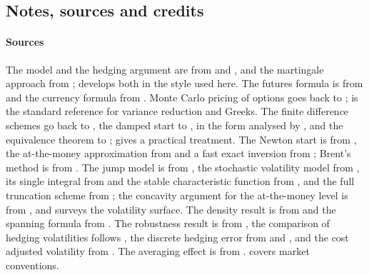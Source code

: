 \begin{chapterrefs}
\section{Notes, sources and credits}
\label{sec5:credits}

\paragraph{Sources}
The model and the hedging argument are from \textcite{black1973} and \textcite{merton1973}, and the
martingale approach from \textcite{harrison1981}; \textcite{shreve2004} develops both in the style used
here. The futures formula is from \textcite{black1976} and the currency formula from
\textcite{garman1983}. Monte Carlo pricing of options goes back to \textcite{boyle1977}; \textcite{glasserman2003} is the standard reference for variance reduction and Greeks.
The finite difference schemes go back to \textcite{crank1947}, the damped start to
\textcite{rannacher1984}, in the form analysed by \textcite{giles2006}, and the equivalence theorem to
\textcite{lax1956}; \textcite{wilmott2006} gives a
practical treatment. The Newton start is from \textcite{manaster1982}, the at-the-money approximation from
\textcite{brenner1988} and a fast exact inversion from \textcite{jaeckel2015}; Brent's method is from
\textcite{brent1973}. The jump model is from \textcite{merton1976}, the stochastic volatility model from
\textcite{heston1993}, its single integral from \textcite{lewis2000} and the stable characteristic
function from \textcite{albrecher2007}, and the full truncation scheme from \textcite{lord2010}; the
concavity argument for the at-the-money level is from \textcite{hullwhite1987}, and
\textcite{gatheral2006} surveys the volatility surface. The density result is from
\textcite{breeden1978} and the spanning formula from \textcite{carr1998}. The robustness result is from \textcite{elkaroui1998}, the comparison of hedging volatilities follows
\textcite{ahmad2005}, the
discrete hedging error from \textcite{boyle1980} and \textcite{bertsimas2000}, and the cost adjusted volatility from
\textcite{leland1985}. The averaging effect is from \textcite{working1960}. \textcite{hull2022} covers market
conventions.


\end{chapterrefs}
